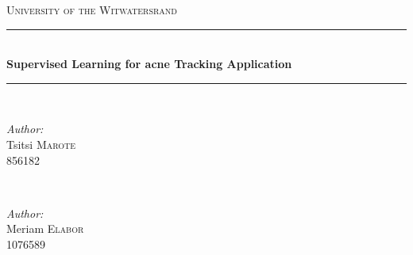 \begin{titlepage}

\newcommand{\HRule}{\rule{\linewidth}{0.5mm}} %

\center %
 

\textsc{\LARGE University of the Witwatersrand}\\[1cm] %


\HRule \\[0.4cm]
{ \huge \bfseries Supervised Learning for acne Tracking Application}\\[0.4cm] %
\HRule \\[1.5cm]
 

\begin{minipage}{0.4\textwidth}
\begin{flushleft} \large
\emph{Author:}\\
Tsitsi \textsc{Marote}\\ 856182 %
\end{flushleft}
\end{minipage}
~
\begin{minipage}{0.4\textwidth}
\begin{flushright} \large
\emph{Author:} \\
Meriam \textsc{Elabor} \\1076589 %
\end{flushright}
\end{minipage}\\[2cm]


\end{titlepage}
